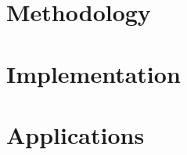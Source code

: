 





\cleardoublepage
\tableofcontents

\cleardoublepage
\pagestyle{fancy}



\part{Methodology}


\part{Implementation}


\part{Applications}



\cleardoublepage
\pagestyle{empty}
\renewcommand\bibname{References}




\appendix
{}


\cleardoublepage


